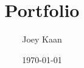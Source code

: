 \renewcommand\contentsname{Inhoudsopgave}

\title{Portfolio}
\author{Joey Kaan}
\date{\today}


\maketitle
\thispagestyle{empty}
\clearpage

